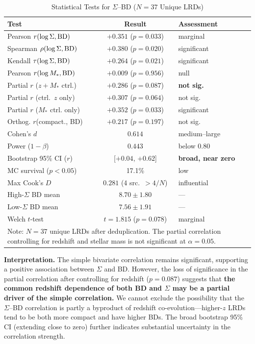 \documentclass[twocolumn,linenumbers]{aastex631}
\begin{document}
\begin{table}[t]
\centering
\caption{Statistical Tests for $\Sigma$--BD ($N=37$ Unique LRDs) \label{tab:ev1_stats}}
\begin{tabular}{lcl}
\hline
Test & Result & Assessment \\
\hline
Pearson $r(\log\Sigma, {\rm BD})$ & $+0.351$ ($p = 0.033$) & marginal \\
Spearman $\rho(\log\Sigma, {\rm BD})$ & $+0.380$ ($p = 0.020$) & significant \\
Kendall $\tau(\log\Sigma, {\rm BD})$ & $+0.264$ ($p = 0.021$) & significant \\
Pearson $r(\log M_*, {\rm BD})$ & $+0.009$ ($p = 0.956$) & null \\
Partial $r$ ($z+M_*$ ctrl.) & $+0.286$ ($p = 0.087$) & \textbf{not sig.} \\
Partial $r$ (ctrl.\ $z$ only) & $+0.307$ ($p = 0.064$) & not sig. \\
Partial $r$ ($M_*$ ctrl. only) & $+0.352$ ($p = 0.033$) & significant \\
Orthog. $r$(compact., BD) & $+0.217$ ($p = 0.197$) & not sig. \\
Cohen's $d$ & $0.614$ & medium--large \\
Power ($1-\beta$) & $0.443$ & below 0.80 \\
Bootstrap 95\% CI ($r$) & [$+0.04$, $+0.62$] & \textbf{broad, near zero} \\
MC survival ($p<0.05$) & 17.1\% & low \\
Max Cook's $D$ & $0.281$ (4 src.\ $>4/N$) & influential \\
High-$\Sigma$ BD mean & $8.70 \pm 1.80$ & --- \\
Low-$\Sigma$ BD mean & $7.56 \pm 1.91$ & --- \\
Welch $t$-test & $t = 1.815$ ($p = 0.078$) & marginal \\
\hline
\multicolumn{3}{l}{\parbox{\dimexpr\textwidth-2\tabcolsep\relax}{\small Note: $N=37$ unique LRDs after deduplication. The partial correlation controlling for redshift and stellar mass is not significant at $\alpha=0.05$.}}\\
\end{tabular}
\end{table}

\textbf{Interpretation.} The simple bivariate correlation remains significant, supporting a positive association between $\Sigma$ and BD. However, the loss of significance in the partial correlation after controlling for redshift ($p = 0.087$) suggests that \textbf{the common redshift dependence of both BD and $\Sigma$ may be a partial driver of the simple correlation.} We cannot exclude the possibility that the $\Sigma$--BD correlation is partly a byproduct of redshift co-evolution---higher-$z$ LRDs tend to be both more compact and have higher BDs. The broad bootstrap 95\% CI (extending close to zero) further indicates substantial uncertainty in the correlation strength.
\end{document}
